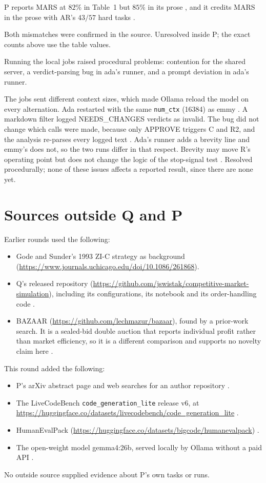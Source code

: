 \documentclass{article}
\begin{document}
\begin{objection}
P reports MARS at \(82\%\) in Table~1 but \(85\%\) in its prose , and it credits MARS in the prose with AR's \(43/57\) hard tasks .
\end{objection}
Both mismatches were confirmed in the source. Unresolved inside P; the exact counts above use the table values.

\begin{objection}
Running the local jobs raised procedural problems: contention for the shared server, a verdict-parsing bug in ada's runner, and a prompt deviation in ada's runner.
\end{objection}
The jobs sent different context sizes, which made Ollama reload the model on every alternation. Ada restarted with the same \texttt{num\_ctx} (16384) as emmy . A markdown filter logged NEEDS\_CHANGES verdicts as invalid. The bug did not change which calls were made, because only APPROVE triggers C and R2, and the analysis re-parses every logged text . Ada's runner adds a brevity line and emmy's does not, so the two runs differ in that respect. Brevity may move R's operating point but does not change the logic of the stop-signal test . Resolved procedurally; none of these issues affects a reported result, since there are none yet.

\section{Sources outside Q and P}
Earlier rounds used the following:
\begin{itemize}
\item Gode and Sunder's 1993 ZI-C strategy as background (\url{https://www.journals.uchicago.edu/doi/10.1086/261868}).
\item Q's released repository (\url{https://github.com/jswistak/competitive-market-simulation}), including its configurations, its notebook and its order-handling code .
\item BAZAAR (\url{https://github.com/lechmazur/bazaar}), found by a prior-work search. It is a sealed-bid double auction that reports individual profit rather than market efficiency, so it is a different comparison and supports no novelty claim here .
\end{itemize}

This round added the following:
\begin{itemize}
\item P's arXiv abstract page and web searches for an author repository .
\item The LiveCodeBench \texttt{code\_generation\_lite} release v6, at \url{https://huggingface.co/datasets/livecodebench/code_generation_lite} .
\item HumanEvalPack (\url{https://huggingface.co/datasets/bigcode/humanevalpack}) .
\item The open-weight model gemma4:26b, served locally by Ollama without a paid API .
\end{itemize}
No outside source supplied evidence about P's own tasks or runs.
\end{document}

